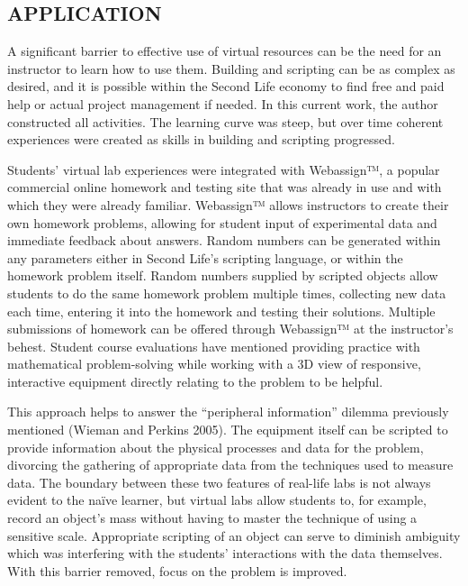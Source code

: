 \documentclass[11.5pt]{sig-alternate} %
\begin{document}
\begin{large}
\section*{APPLICATION}

A significant barrier to effective use of virtual resources can be the need for an instructor to learn how to use them. Building and scripting can be as complex as desired, and it is possible within the Second Life economy to find free and paid help or actual project management if needed. In this current work, the author constructed all activities. The learning curve was steep, but over time coherent experiences were created as skills in building and scripting progressed.

Students’ virtual lab experiences were integrated with Webassign™, a popular commercial online homework and testing site that was already in use and with which they were already familiar. Webassign™ allows instructors to create their own homework problems, allowing for student input of experimental data and immediate feedback about answers. Random numbers can be generated within any parameters either in Second Life’s scripting language, or within the homework problem itself. Random numbers supplied by scripted objects allow students to do the same homework problem multiple times, collecting new data each time, entering it into the homework and testing their solutions. Multiple submissions of homework can be offered through Webassign™ at the instructor’s behest. Student course evaluations have mentioned providing practice with mathematical problem-solving while working with a 3D view of responsive, interactive equipment directly relating to the problem to be helpful.

This approach helps to answer the “peripheral information” dilemma previously mentioned (Wieman and Perkins 2005). The equipment itself can be scripted to provide information about the physical processes and data for the problem, divorcing the gathering of appropriate data from the techniques used to measure data. The boundary between these two features of real-life labs is not always evident to the naïve learner, but virtual labs allow students to, for example, record an object’s mass without having to master the technique of using a sensitive scale. Appropriate scripting of an object can serve to diminish ambiguity which was interfering with the students’ interactions with the data themselves. With this barrier removed, focus on the problem is improved.


\end{large}
\end{document}

